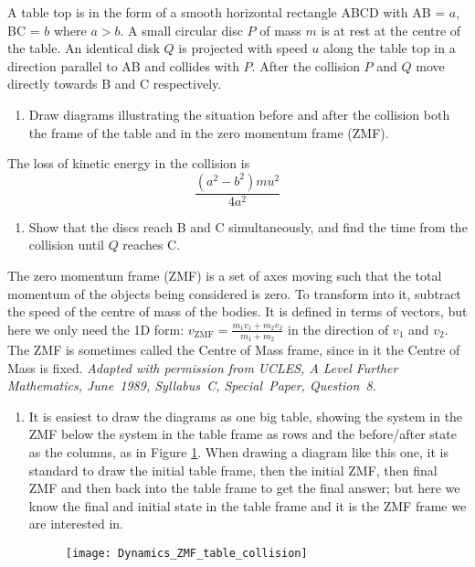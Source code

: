 
\begin{hint}[Discs on a Table]%
{A table top is in the form of a smooth horizontal rectangle ABCD with AB = $a$, BC = $b$ where $a>b$. A small circular disc $P$ of mass $m$ is at rest at the centre of the table. An identical disk $Q$ is projected with speed $u$ along the table top in a direction parallel to AB and collides with $P$. After the collision $P$ and $Q$ move directly towards B and C respectively.
\begin{enumerate}
	\item Draw diagrams illustrating the situation before and after the collision both the frame of the table and in the zero momentum frame (ZMF).
\end{enumerate}
The loss of kinetic energy in the collision is \begin{equation*} \frac{(a^{2} - b^{2}) mu^{2}}{4a^{2}} \end{equation*}
\begin{enumerate}[resume]
	\item Show that the discs reach B and C simultaneously, and find the time from the collision until $Q$ reaches C.
	
\end{enumerate}
}
{The zero momentum frame (ZMF) is a set of axes moving such that the total momentum of the objects being considered is zero. To transform into it, subtract the speed of the centre of mass of the bodies. It is defined in terms of vectors, but here we only need the 1D form:  $v_{\textrm{ZMF}} = \frac{m_{1}v_{1} + m_{2}v_{2}}{m_{1} + m_{2}}$ in the direction of $v_{1}$ and $v_{2}$. The ZMF is sometimes called the Centre of Mass frame, since in it the Centre of Mass is fixed.}
{\textit{Adapted with permission from UCLES, A Level Further Mathematics, June~1989, Syllabus~C, Special~Paper, Question~8.}}
{\begin{enumerate}
	\item It is easiest to draw the diagrams as one big table, showing the system in the ZMF below the system in the table frame as rows and the before/after state as the columns, as in Figure \ref{fig:Dynamics_ZMF_table_collision}. When drawing a diagram like this one, it is standard to draw the initial table frame, then the initial ZMF, then final ZMF and then back into the table frame to get the final answer; but here we know the final and initial state in the table frame and it is the ZMF frame we are interested in.
\begin{figure}[h]
\centering
\texttt{[image: Dynamics\_ZMF\_table\_collision]}
\caption{}
\label{fig:Dynamics_ZMF_table_collision}
\end{figure}


\end{enumerate}}
\end{hint}
